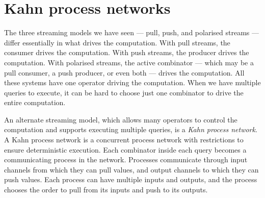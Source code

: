 \section{Kahn process networks}
\label{taxonomy/kpn}

The three streaming models we have seen --- pull, push, and polarised streams --- differ essentially in what drives the computation.
With pull streams, the consumer drives the computation.
With push streams, the producer drives the computation.
With polarised streams, the active combinator --- which may be a pull consumer, a push producer, or even both --- drives the computation.
All these systems have one operator driving the computation.
When we have multiple queries to execute, it can be hard to choose just one combinator to drive the entire computation.

An alternate streaming model, which allows many operators to control the computation and supports executing multiple queries, is a \emph{Kahn process network}.
A Kahn process network is a concurrent process network with restrictions to ensure deterministic execution.
Each combinator inside each query becomes a communicating process in the network.
Processes communicate through input channels from which they can pull values, and output channels to which they can push values.
Each process can have multiple inputs and outputs, and the process chooses the order to pull from its inputs and push to its outputs.

